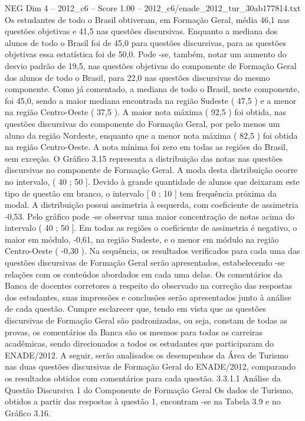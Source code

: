 \begin{textsample}{NEG Dim 4 – 2012\_c6 – Score 1.00 – 2012\_c6/enade\_2012\_tur\_30ab177814.txt}
Os estudantes de todo o Brasil obtiveram, em Formação Geral, média 46,1 nas questões objetivas e 41,5 nas questões discursivas.
Enquanto a mediana dos alunos de todo o Brasil foi de 45,0 para questões discursivas, para as questões objetivas essa estatística foi de 50,0.
Pode -se, também, notar um aumento do desvio padrão de 19,5, nas questões objetivas do componente de Formação Geral dos alunos de todo o Brasil, para 22,0 nas questões discursivas do mesmo componente.
Como já comentado, a mediana de todo o Brasil, neste componente, foi 45,0, sendo a maior mediana encontrada na região Sudeste ( 47,5 ) e a menor na região Centro-Oeste ( 37,5 ).
A maior nota máxima ( 92,5 ) foi obtida, nas questões discursivas do componente do Formação Geral, por pelo menos um aluno da região Nordeste, enquanto que a menor nota máxima ( 82,5 ) foi obtida na região Centro-Oeste.
A nota mínima foi zero em todas as regiões do Brasil, sem exceção.
O Gráfico 3.15 representa a distribuição das notas nas questões discursivas no componente de Formação Geral.
A moda desta distribuição ocorre no intervalo, ( 40 ; 50 ].
Devido à grande quantidade de alunos que deixaram este tipo de questão em branco, o intervalo [ 0 ; 10 ] tem frequência próxima da modal.
A distribuição possui assimetria à esquerda, com coeficiente de assimetria -0,53.
Pelo gráfico pode -se observar uma maior concentração de notas acima do intervalo ( 40 ; 50 ].
Em todas as regiões o coeficiente de assimetria é negativo, o maior em módulo, -0,61, na região Sudeste, e o menor em módulo na região Centro-Oeste ( -0,30 ).
Na sequência, os resultados verificados para cada uma das questões discursivas de Formação Geral serão apresentados, estabelecendo -se relações com os conteúdos abordados em cada uma delas.
Os comentários da Banca de docentes corretores a respeito do observado na correção das respostas dos estudantes, suas impressões e conclusões serão apresentados junto à análise de cada questão.
Cumpre esclarecer que, tendo em vista que as questões discursivas de Formação Geral são padronizadas, ou seja, constam de todas as provas, os comentários da Banca são os mesmos para todas as carreiras acadêmicas, sendo direcionados a todos os estudantes que participaram do ENADE/2012.
A seguir, serão analisados os desempenhos da Área de Turismo nas duas questões discursivas de Formação Geral do ENADE/2012, comparando os resultados obtidos com comentários para cada questão. 3.3.1.1 Análise da Questão Discursiva 1 do Componente de Formação Geral Os dados de Turismo, obtidos a partir das respostas à questão 1, encontram -se na Tabela 3.9 e no Gráfico 3.16.

\end{textsample}
